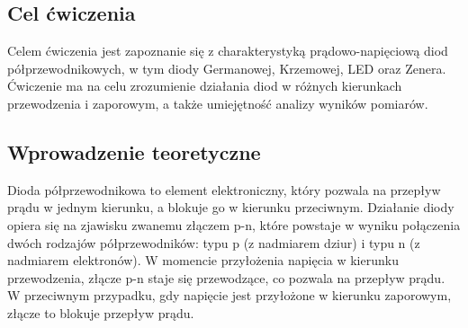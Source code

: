 \documentclass[10.5pt]{article}
\begin{document}
\subsection*{Cel ćwiczenia}
Celem ćwiczenia jest zapoznanie się z charakterystyką prądowo-napięciową diod półprzewodnikowych, 
w tym diody Germanowej, Krzemowej, LED oraz Zenera. 
Ćwiczenie ma na celu zrozumienie działania diod w różnych kierunkach przewodzenia i zaporowym, a także umiejętność analizy wyników pomiarów.
\subsection*{Wprowadzenie teoretyczne}
Dioda półprzewodnikowa to element elektroniczny, który pozwala na przepływ prądu w jednym kierunku, 
a blokuje go w kierunku przeciwnym. Działanie diody opiera się na zjawisku zwanemu złączem p-n, 
które powstaje w wyniku połączenia dwóch rodzajów półprzewodników: typu p (z nadmiarem dziur) i typu n (z nadmiarem elektronów). 
W momencie przyłożenia napięcia w kierunku przewodzenia, złącze p-n staje się przewodzące, co pozwala na przepływ prądu. 
W przeciwnym przypadku, gdy napięcie jest przyłożone w kierunku zaporowym, złącze to blokuje przepływ prądu.
\end{document}
